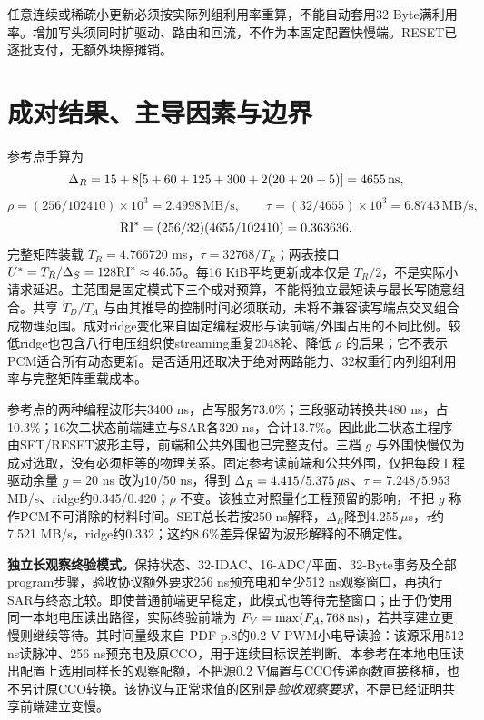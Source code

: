 任意连续或稀疏小更新必须按实际列组利用率重算，不能自动套用32 Byte满利用率。增加写头须同时扩驱动、路由和回流，不作为本固定配置快慢端。RESET已逐批支付，无额外块擦摊销。

\section{成对结果、主导因素与边界}



参考点手算为
\[
 \Delta_R=15+8[5+60+125+300+2(20+20+5)]=4655\,\mathrm{ns},
\]
\[
 \rho=(256/102410)\times10^3=2.4998\,\mathrm{MB/s},\qquad
 \tau=(32/4655)\times10^3=6.8743\,\mathrm{MB/s},
\]
\[
 \mathrm{RI}^*=(256/32)(4655/102410)=0.363636.
\]
完整矩阵装载 $T_R=4.766720$ ms，$\tau=32768/T_R$；两表接口 $U^*=T_R/\Delta_S=128\mathrm{RI}^*\approx46.55$。每16 KiB平均更新成本仅是 $T_R/2$，不是实际小请求延迟。主范围是固定模式下三个成对预算，不能将独立最短读与最长写随意组合。共享 $T_D/T_A$ 与由其推导的控制时间必须联动，未将不兼容读写端点交叉组合成物理范围。成对ridge变化来自固定编程波形与读前端/外围占用的不同比例。较低ridge也包含八行电压组织使streaming重复2048轮、降低 $\rho$ 的后果；它不表示PCM适合所有动态更新。是否适用还取决于绝对两路能力、32权重行内列组利用率与完整矩阵重载成本。



参考点的两种编程波形共3400 ns，占写服务73.0\%；三段驱动转换共480 ns，占10.3\%；16次二状态前端建立与SAR各320 ns，合计13.7\%。因此此二状态主程序由SET/RESET波形主导，前端和公共外围也已完整支付。三档 $g$ 与外围快慢仅为成对选取，没有必须相等的物理关系。固定参考读前端和公共外围，仅把每段工程驱动余量 $g=20$ ns 改为10/50 ns，得到 $\Delta_R=4.415/5.375\,\mu\mathrm{s}$、$\tau=7.248/5.953$ MB/s、ridge约0.345/0.420；$\rho$ 不变。该独立对照量化工程预留的影响，不把 $g$ 称作PCM不可消除的材料时间。SET总长若按250 ns解释，$\Delta_R$降到4.255\,$\mu$s，$\tau$约7.521 MB/s，ridge约0.332；这约8.6\%差异保留为波形解释的不确定性。

\textbf{独立长观察终验模式。}保持状态、32-IDAC、16-ADC/平面、32-Byte事务及全部program步骤，验收协议额外要求256 ns预充电和至少512 ns观察窗口，再执行SAR与终态比较。即使普通前端更早稳定，此模式也等待完整窗口；由于仍使用同一本地电压读出路径，实际终验前端为 $F_V=\max(F_A,768\,\mathrm{ns})$，若共享建立更慢则继续等待。其时间量级来自 PDF p.8的0.2 V PWM小电导读验：该源采用512 ns读脉冲、256 ns预充电及原CCO，用于连续目标误差判断。本参考在本地电压读出配置上选用同样长的观察配额，不把源0.2 V偏置与CCO传递函数直接移植，也不另计原CCO转换。该协议与正常求值的区别是\emph{验收观察要求}，不是已经证明共享前端建立变慢。

